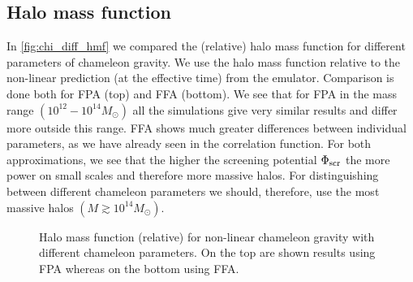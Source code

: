 \subsection{Halo mass function}
In \autoref{fig:chi_diff_hmf} we compared the (relative) halo mass function for different parameters of chameleon gravity. We use the halo mass function relative to the non-linear prediction (at the effective time) from the emulator. Comparison is done both for FPA (top) and FFA (bottom). We see that for FPA in the mass range $(10^{12}-10^{14}M_\odot)$ all the simulations give very similar results and differ more outside this range. FFA shows much greater differences between individual parameters, as we have already seen in the correlation function. For both approximations, we see that the higher the screening potential $\Phi_{\text{\scriptsize scr}}$ the more power on small scales and therefore more massive halos. For distinguishing between different chameleon parameters we should, therefore, use the most massive halos $(M\gtrsim10^{14}M_\odot)$.
\begin{figure*}
	\centering
	\chileft
	\begin{subfigure}{1.2\textwidth}
	\end{subfigure}
	\begin{subfigure}{1.0\textwidth}
		\centering
	\end{subfigure}
	\begin{subfigure}{1.0\textwidth}
		\centering
	\end{subfigure}
	\caption{Halo mass function (relative) for non-linear chameleon gravity with different chameleon parameters. On the top are shown results using FPA whereas on the bottom using FFA.}
	\label{fig:chi_diff_hmf}
\end{figure*}